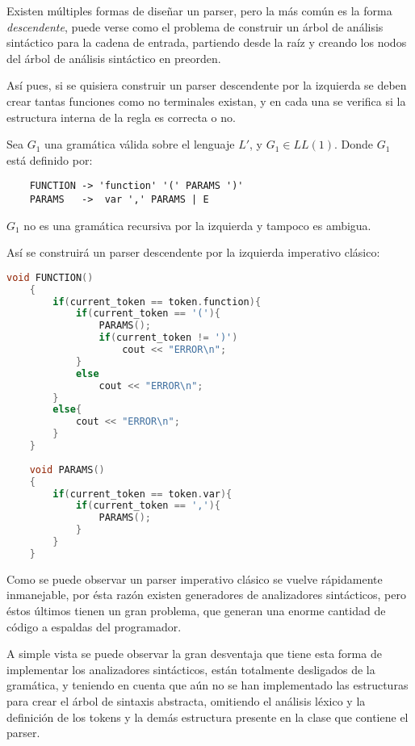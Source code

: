 Existen múltiples formas de diseñar un parser, pero la más común es la forma \emph{descendente}, puede verse como el problema de construir un árbol de análisis sintáctico para la cadena de entrada, partiendo desde la raíz y creando los nodos del árbol de análisis sintáctico en preorden.\cite{Dragon}

Así pues, si se quisiera construir un parser descendente por la izquierda se deben crear tantas funciones como no terminales existan, y en cada una se verifica si la estructura interna de la regla es correcta o no.

\begin{exmp}
	Sea $G_1$ una gramática válida sobre el lenguaje $L'$, y $G_1 \in LL(1)$.
	Donde $G_1$ está definido por:
		
	\begin{lstlisting}
	FUNCTION -> 'function' '(' PARAMS ')'
	PARAMS   ->  var ',' PARAMS | E
	\end{lstlisting}
	
	$G_1$ no es una gramática recursiva por la izquierda y tampoco es ambigua.
	
	Así se construirá un parser descendente por la izquierda imperativo clásico:
	\begin{lstlisting}[language=C++, caption="Parser imperativo"]
	void FUNCTION()
	{
		if(current_token == token.function){
			if(current_token == '('){
				PARAMS();
				if(current_token != ')')
					cout << "ERROR\n";
			}
			else
				cout << "ERROR\n";
		}
		else{
			cout << "ERROR\n";
		}
	}
	
	void PARAMS()
	{
		if(current_token == token.var){
			if(current_token == ','){
				PARAMS();
			}
		}
	}
	\end{lstlisting}
\end{exmp}

	Como se puede observar un parser imperativo clásico se vuelve rápidamente inmanejable, por ésta razón existen generadores de analizadores sintácticos, pero éstos últimos tienen un gran problema, que generan una enorme cantidad de código a espaldas del programador.
	
	A simple vista se puede observar la gran desventaja que tiene esta forma de implementar los analizadores sintácticos, están totalmente desligados de la gramática, y teniendo en cuenta que aún no se han implementado las estructuras para crear el árbol de sintaxis abstracta, omitiendo el análisis léxico y la definición de los tokens y la demás estructura presente en la clase que contiene el parser.


